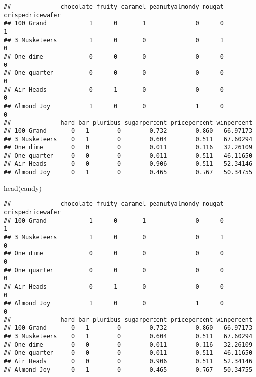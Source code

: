 \documentclass[
]{article}
\newenvironment{Shaded}{\begin{snugshade}}{\end{snugshade}}
\newcommand{\FunctionTok}[1]{\textcolor[rgb]{0.00,0.00,0.00}{#1}}
\newcommand{\NormalTok}[1]{#1}
\begin{document}
\begin{verbatim}
##              chocolate fruity caramel peanutyalmondy nougat crispedricewafer
## 100 Grand            1      0       1              0      0                1
## 3 Musketeers         1      0       0              0      1                0
## One dime             0      0       0              0      0                0
## One quarter          0      0       0              0      0                0
## Air Heads            0      1       0              0      0                0
## Almond Joy           1      0       0              1      0                0
##              hard bar pluribus sugarpercent pricepercent winpercent
## 100 Grand       0   1        0        0.732        0.860   66.97173
## 3 Musketeers    0   1        0        0.604        0.511   67.60294
## One dime        0   0        0        0.011        0.116   32.26109
## One quarter     0   0        0        0.011        0.511   46.11650
## Air Heads       0   0        0        0.906        0.511   52.34146
## Almond Joy      0   1        0        0.465        0.767   50.34755
\end{verbatim}

\begin{Shaded}
\begin{Highlighting}[]
\FunctionTok{head}\NormalTok{(candy)}
\end{Highlighting}
\end{Shaded}

\begin{verbatim}
##              chocolate fruity caramel peanutyalmondy nougat crispedricewafer
## 100 Grand            1      0       1              0      0                1
## 3 Musketeers         1      0       0              0      1                0
## One dime             0      0       0              0      0                0
## One quarter          0      0       0              0      0                0
## Air Heads            0      1       0              0      0                0
## Almond Joy           1      0       0              1      0                0
##              hard bar pluribus sugarpercent pricepercent winpercent
## 100 Grand       0   1        0        0.732        0.860   66.97173
## 3 Musketeers    0   1        0        0.604        0.511   67.60294
## One dime        0   0        0        0.011        0.116   32.26109
## One quarter     0   0        0        0.011        0.511   46.11650
## Air Heads       0   0        0        0.906        0.511   52.34146
## Almond Joy      0   1        0        0.465        0.767   50.34755
\end{verbatim}
\end{document}
